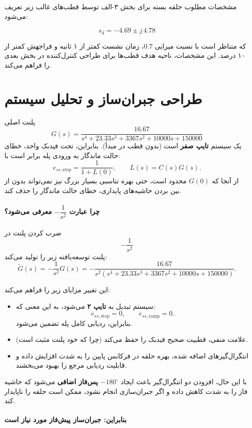 \documentclass[a4paper]{article}
\begin{document}
مشخصات مطلوب حلقه بسته برای بخش ۳-الف توسط قطب‌های غالب زیر تعریف می‌شود:

\[
\boxed{s_d = -4.69 \pm j\,4.78}
\]

که متناظر است با نسبت میرایی $0.7$، زمان نشست کمتر از ۱ ثانیه و فراجهش کمتر از ۱۰ درصد. این مشخصات، ناحیه هدف قطب‌ها برای طراحی کنترل‌کننده در بخش بعدی را فراهم می‌کند.
\section*{طراحی جبران‌ساز و تحلیل سیستم}

پلنت اصلی
\[
G(s)=\frac{16.67}{s^4+23.33s^3+3367s^2+10000s+150000}
\]
یک سیستم \textbf{تایپ صفر}  است (بدون قطب در مبدأ).
بنابراین، تحت فیدبک واحد، خطای حالت ماندگار به ورودی پله برابر است با:
\[
e_{ss,\text{step}}=\frac{1}{1+L(0)}, \qquad L(s)=C(s)G(s).
\]
از آنجا که $G(0)$ محدود است، حتی بهره تناسبی بسیار بزرگ نیز نمی‌تواند بدون از بین بردن حاشیه‌های پایداری، خطای حالت ماندگار را حذف کند.

\paragraph{چرا عبارت $-\dfrac{1}{s^2}$ معرفی می‌شود؟}

ضرب کردن پلنت در
\[
-\frac{1}{s^2}
\]
پلنت توسعه‌یافته  زیر را تولید می‌کند:
\[
\tilde{G}(s)= -\frac{1}{s^2}G(s)
=
-\frac{16.67}{s^2\left(s^4+23.33s^3+3367s^2+10000s+150000\right)}.
\]

این تغییر مزایای زیر را فراهم می‌کند:

\begin{itemize}
	\item سیستم تبدیل به \textbf{تایپ ۲} می‌شود، به این معنی که:
	\[
	e_{ss,\text{step}} = 0, \qquad e_{ss,\text{ramp}} = 0.
	\]
	بنابراین، ردیابی کامل پله تضمین می‌شود.
	\item علامت منفی، قطبیت صحیح فیدبک را حفظ می‌کند (چرا که خود پلنت مثبت است).
	\item انتگرال‌گیرهای اضافه شده، بهره حلقه در فرکانس پایین را به شدت افزایش داده و قابلیت ردیابی مرجع را بهبود می‌بخشند.
\end{itemize}

با این حال، افزودن دو انتگرال‌گیر باعث ایجاد \textbf{$-180^\circ$ پس‌فاز  اضافی} می‌شود که حاشیه فاز را به شدت کاهش داده و اگر جبران‌سازی انجام نشود، ممکن است حلقه را ناپایدار کند.

\paragraph{بنابراین: جبران‌ساز پیش‌فاز  مورد نیاز است}
\end{document}

